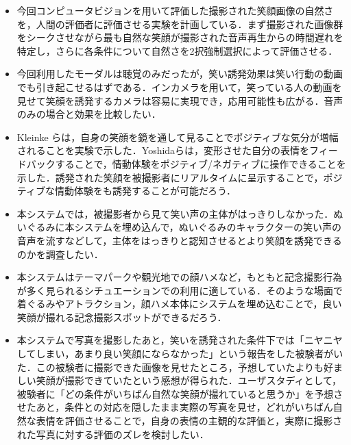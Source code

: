 \documentclass[submit,techreq]{ec2014}
\begin{document}
\begin{itemize}
\item 今回コンピュータビジョンを用いて評価した撮影された笑顔画像の自然さを，人間の評価者に評価させる実験を計画している．まず撮影された画像群をシークさせながら最も自然な笑顔が撮影された音声再生からの時間遅れを特定し，さらに各条件について自然さを2択強制選択によって評価させる．
\item 今回利用したモーダルは聴覚のみだったが，笑い誘発効果は笑い行動の動画でも引き起こせるはずである．インカメラを用いて，笑っている人の動画を見せて笑顔を誘発するカメラは容易に実現でき，応用可能性も広がる．音声のみの場合と効果を比較したい．
\item Kleinke らは，自身の笑顔を鏡を通して見ることでポジティブな気分が増幅されることを実験で示した\cite{kleinke1998effects}．Yoshidaらは，変形させた自分の表情をフィードバックすることで，情動体験をポジティブ/ネガティブに操作できることを示した\cite{Yoshida2013}．誘発された笑顔を被撮影者にリアルタイムに呈示することで，ポジティブな情動体験をも誘発することが可能だろう．
\item 本システムでは，被撮影者から見て笑い声の主体がはっきりしなかった．ぬいぐるみに本システムを埋め込んで，ぬいぐるみのキャラクターの笑い声の音声を流すなどして，主体をはっきりと認知させるとより笑顔を誘発できるのかを調査したい．
\item 本システムはテーマパークや観光地での顔ハメなど，もともと記念撮影行為が多く見られるシチュエーションでの利用に適している．そのような場面で着ぐるみやアトラクション，顔ハメ本体にシステムを埋め込むことで，良い笑顔が撮れる記念撮影スポットができるだろう．
\item 本システムで写真を撮影したあと，笑いを誘発された条件下では「ニヤニヤしてしまい，あまり良い笑顔にならなかった」という報告をした被験者がいた．この被験者に撮影できた画像を見せたところ，予想していたよりも好ましい笑顔が撮影できていたという感想が得られた．ユーザスタディとして，被験者に「どの条件がいちばん自然な笑顔が撮れていると思うか」を予想させたあと，条件との対応を隠したまま実際の写真を見せ，どれがいちばん自然な表情を評価させることで，自身の表情の主観的な評価と，実際に撮影された写真に対する評価のズレを検討したい．
\end{itemize}

\break







\end{document}
